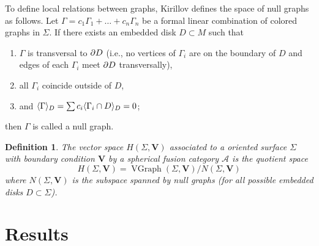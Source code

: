 \documentclass{amsart}
\newtheorem{prop}[thm]{Proposition}
\newtheorem{defn}[thm]{Definition}
\newcommand{\Hs}{H}
\DeclareMathOperator{\MCG}{MCG}
\DeclareMathOperator{\Homeo}{Homeo}
\DeclareMathOperator{\VGr}{VGraph}
\newcommand{\VV}{\mathbf{V}}       %
\newcommand{\Ga}{\Gamma}
\newcommand{\Si}{\Sigma}
\begin{document}
To define local relations between graphs, Kirillov defines the space of
null graphs as follows. Let
$\Ga=c_1\Ga_1+\dots+c_n\Ga_n$ be a formal linear
combination of colored graphs in $\Si$.  If there exists an embedded disk $D \subset M$ such that
\begin{enumerate}
  \item $\Ga$ is transversal to $\partial D$ (i.e., no vertices of $\Ga_i$ 
      are on the boundary of $D$ and edges of each $\Ga_i$ meet 
      $\partial D$ transversally),
  \item all $\Ga_i$ coincide outside of $D$,
  \item and $\<\Ga\>_D=\sum c_i\<\Ga_i\cap D\>_D=0$;
\end{enumerate}
then $\Ga$ is called a null graph. 




\begin{defn}
The vector space $\Hs(\Si, \VV)$ associated to a oriented surface $\Si$ with boundary condition $\VV$ by a spherical fusion category $\mathcal A$ is the quotient space
 $$
   \Hs(\Si, \VV)=\VGr(\Si, \VV)/N(\Si, \VV)
  $$
  where $N(\Si, \VV)$ is  the subspace spanned by null graphs 
  (for all possible embedded disks  $D \subset \Si$). 
\end{defn}

\section{Results}



\end{document}
